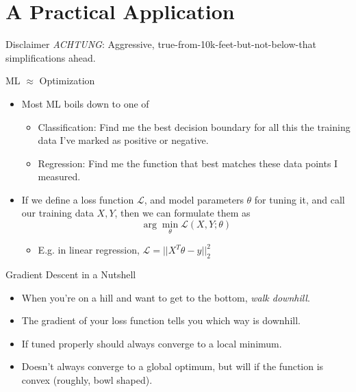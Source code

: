 \documentclass[pdf]{beamer}
\begin{document}
\section{A Practical Application}
\begin{frame}{Disclaimer}
  \emph{ACHTUNG}: Aggressive, true-from-10k-feet-but-not-below-that simplifications
  ahead.
\end{frame}
  
\begin{frame}[fragile]{ML $\approx$ Optimization}
  \begin{itemize}
  \item Most ML boils down to one of
    \begin{itemize}
    \item Classification: Find me the best decision boundary for all this the
      training data I've marked as positive or negative.
    \item Regression: Find me the function that best matches these data points I
      measured.
    \end{itemize}
  \item If we define a loss function $\mathcal{L}$, and model parameters
    $\theta$ for tuning it, and call our training data $X, Y$, then we
    can formulate them as
    \[ \arg\min_{\theta} \mathcal{L}(X,Y;\theta) \]
    \begin{itemize}
    \item E.g. in linear regression, $\mathcal{L} = ||X^T\theta - y||_2^2$
    \end{itemize}
  \end{itemize}
\end{frame}

\begin{frame}{Gradient Descent in a Nutshell}
  \begin{itemize}
  \item When you're on a hill and want to get to the bottom, \emph{walk downhill}.
  \item The gradient of your loss function tells you which way is downhill.
  \item If tuned properly should always converge to a local minimum.
  \item Doesn't always converge to a global optimum, but will if the function is
    convex (roughly, bowl shaped).
  \end{itemize}
\end{frame}
\end{document}
